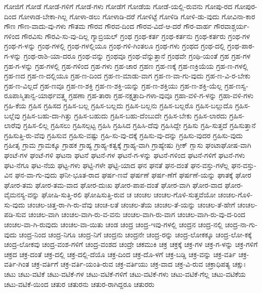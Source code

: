 {ಗೋಜಿಗೆ
ಗೋಡೆ
ಗೋಡೆ-ಗಳಿಗೆ
ಗೋಡೆ-ಗಳು
ಗೋಡೆಗೆ
ಗೋಡೆಯ
ಗೋಡೆ-ಯಲ್ಲಿ-ರುವನು
ಗೋಪು-ರದ
ಗೋಪುರ-ದಿಂದ
ಗೋಳಾಡ-ಬೇಕಾ-ಗಿಲ್ಲ
ಗೋಳಾ-ಡಲು
ಗೋಳಾಡಿ-ದರೆ
ಗೋಳಿಟ್ಟೆ
ಗೋಳಿಡಿ
ಗೋಳಿ-ಡು-ವುದು
ಗೋವಿನಾ-ಕಾರ
ಗೌಣ
ಗೌಣ-ವಾದು-ವು-ಗಳು
ಗೌತಮ
ಗೌರವ
ಗೌರವ-ದಿಂದ
ಗೌರವ-ವಿದೆ-ಆ-ದರೆ
ಗೌರ-ವಾರ್ಹ
ಗೌರವಾಶ್ಚರ್ಯ-ಗಳಿಂದ
ಗೌರವಿಸು
ಗೌರವಿ-ಸು-ವು-ದಿಲ್ಲ
ಗ್ಯಾಬ್ರಿಯಲ್
ಗ್ರಂಥ
ಗ್ರಂಥ-ಕರ್ತ
ಗ್ರಂಥ-ಕರ್ತನು
ಗ್ರಂಥ-ಕರ್ತರು
ಗ್ರಂಥ-ಗಳ
ಗ್ರಂಥ-ಗ-ಳನ್ನು
ಗ್ರಂಥ-ಗಳಲ್ಲಿ
ಗ್ರಂಥ-ಗಳಲ್ಲಿಯೂ
ಗ್ರಂಥ-ಗಳಿ-ಗಿಂತಲೂ
ಗ್ರಂಥ-ಗಳು
ಗ್ರಂಥದ
ಗ್ರಂಥ-ದಲ್ಲಿ
ಗ್ರಂಥ-ಪಾಠ-ಗ-ಳನ್ನು
ಗ್ರಂಥ-ರಾಶಿ-ಯಾ-ದರೂ
ಗ್ರಂಥ-ವನ್ನು
ಗ್ರಂಥವೂ
ಗ್ರಂಥ-ವೆನ್ನುತ್ತಾನೆ
ಗ್ರಂಥವೇ
ಗ್ರಂಥಿ-ಯಂತೆ
ಗ್ರಹ
ಗ್ರಹ-ಗಳ
ಗ್ರಹ-ಗ-ಳನ್ನು
ಗ್ರಹ-ಗಳಲ್ಲಿ
ಗ್ರಹ-ಗಳಿಂದ
ಗ್ರಹ-ಗಳು
ಗ್ರಹ-ಚಾರ
ಗ್ರಹಣ
ಗ್ರಹ-ಣಕ್ಕೆ
ಗ್ರಹ-ಣಕ್ರಿಯೆಯ
ಗ್ರಹ-ಣ-ಗಳಲ್ಲಿ
ಗ್ರಹ-ಣದ
ಗ್ರಹ-ಣ-ದಲ್ಲಿಯೂ
ಗ್ರಹ-ಣ-ದಿಂದ
ಗ್ರಹ-ಣ-ಮಾಡು-ವಾಗ
ಗ್ರಹ-ಣ-ವಾ-ಗು-ವುದು
ಗ್ರಹ-ಣ-ವಿ-ರ-ಬೇಕು
ಗ್ರಹ-ಣ-ವಿಲ್ಲದೆ
ಗ್ರಹ-ಣವೂ
ಗ್ರಹ-ಣ-ಶಕ್ತಿ
ಗ್ರಹ-ಣ-ಶಕ್ತಿ-ಯನ್ನು
ಗ್ರಹ-ಣ-ಶಕ್ತಿಯು
ಗ್ರಹ-ಣ-ಶಕ್ತಿ-ಯೆಲ್ಲ
ಗ್ರಹ-ಣಸ್ವ-ರೂಪಾಸ್ಮಿತಾನ್ವ-ಯಾರ್ಥವತ್ತ್ವ
ಗ್ರಹಣಾ
ಗ್ರಹ-ತಾರಾ
ಗ್ರಹ-ನಕ್ಷತ್ರಾದಿ-ಗಳಾ-ವುವೂ
ಗ್ರಹಾ-ವಳಿ-ಗ-ಳನ್ನು
ಗ್ರಹಾ-ವಳಿ-ಗಳು
ಗ್ರಹಿ-ಕೆಯ
ಗ್ರಹಿಸ
ಗ್ರಹಿಸದ
ಗ್ರಹಿಸ-ಬಲ್ಲ
ಗ್ರಹಿಸ-ಬಲ್ಲದು
ಗ್ರಹಿಸ-ಬಲ್ಲನು
ಗ್ರಹಿಸ-ಬಲ್ಲರೊ
ಗ್ರಹಿಸ-ಬಲ್ಲುದೊ
ಗ್ರಹಿಸ-ಬಲ್ಲೆವು
ಗ್ರಹಿಸ-ಬಹು-ದಾ-ಗಿತ್ತು
ಗ್ರಹಿಸ-ಬಹುದು
ಗ್ರಹಿಸ-ಬಹು-ದೆಂಬುದೇ
ಗ್ರಹಿಸ-ಬೇಕು
ಗ್ರಹಿಸ-ಲಾರದು
ಗ್ರಹಿಸ-ಲಾರೆವು
ಗ್ರಹಿಸ-ಲಿಲ್ಲ
ಗ್ರಹಿಸಲು
ಗ್ರಹಿಸಲ್ಪಟ್ಟ
ಗ್ರಹಿಸಿ
ಗ್ರಹಿಸಿದ
ಗ್ರಹಿಸಿ-ದೆವು
ಗ್ರಹಿಸಿದ್ದೇ
ಗ್ರಹಿಸು
ಗ್ರಹಿ-ಸುತ್ತದೆ
ಗ್ರಹಿಸುತ್ತಾನೆ
ಗ್ರಹಿಸುತ್ತಿ-ರು-ವೆವು
ಗ್ರಹಿಸುವ
ಗ್ರಹಿಸು-ವಷ್ಟು
ಗ್ರಹಿ-ಸು-ವು-ದಕ್ಕೆ
ಗ್ರಹಿಸು-ವು-ದನ್ನು
ಗ್ರಹಿಸು-ವುದರ
ಗ್ರಹಿಸು-ವುದು
ಗ್ರಹೀತೃ
ಗ್ರಾಮ
ಗ್ರಾಮಕ್ಕೂ
ಗ್ರಾಹಕ
ಗ್ರಾಹ್ಯ
ಗ್ರಾಹ್ಯ-ಕತ್ವಕ್ಕೆ
ಗ್ರಾಹ್ಯ-ವಾಗಿ
ಗ್ರಾಹ್ಯೇಷು
ಗ್ರೀಕ್
ಗ್ಲಾಸು
ಘಂಟಾಘೋಷ-ವಾಗಿ
ಘಂಟೆ-ಗಳ
ಘಂಟೆ-ಗಳಿ
ಘಟನಾ
ಘಟನೆ
ಘಟನೆ-ಗಳ
ಘಟನೆ-ಗ-ಳನ್ನು
ಘಟನೆ-ಗಳಿಂದ
ಘಟನೆ-ಗಳಿಗೆ
ಘಟನೆ-ಗಳು
ಘಟ-ನೆಗೂ
ಘಟ-ನೆಯ
ಘಟ್ಟ-ಗಳು
ಘಟ್ಟಿ-ಗಳೇ
ಘಟ್ಟಿ-ಯಾದ
ಘನ
ಘನತೆ
ಘನ-ದಂತೆ
ಘನ-ವಸ್ತು-ಗಳೆಲ್ಲ
ಘನ-ವಸ್ತು-ವಿನ
ಘನ-ವಾ-ಗು-ವುದು
ಘನೀ-ಭೂತ-ರಾದ
ಘರ್ಷ-ಣವೆ
ಘರ್ಷಣೆ
ಘರ್ಷ-ಣೆಗೆ
ಘರ್ಷಣೆ-ಯನ್ನು
ಘಾತಕ್ಕೆ
ಘೋರ
ಘೋರ-ತಮ
ಘೋರ-ತಮ-ವಾದ
ಘೋರ-ದುಃಖ
ಘೋರ-ಪಾಪ-ದಂತೆ
ಘೋರ-ವಾಗಿ
ಘೋರ-ವಾದ
ಘೋರ-ವೈಮನಸ್ಯ-ವನ್ನು
ಘೋಷಿ-ಸುತ್ತಿ-ರಲಿ
ಘೋಷಿಸುತ್ತಿ-ರುವ
ಚ
ಚಂಚಲ
ಚಂಚಲ-ಗೊಳಿ-ಸುತ್ತವೆಯೋ
ಚಂಚಲ-ಗೊಳಿ-ಸು-ವುದು
ಚಂಚಲ-ಚಿತ್ತ-ರಾ-ಗಿ-ರು-ವೆವು
ಚಂಚ-ಲತೆ
ಚಂಚಲ-ತೆಯ
ಚಂಚಲ-ತೆ-ಯನ್ನು
ಚಂಚಲ-ತೆ-ಹೇಗೆ
ಚಂಚಲ-ಪಡಿ-ಸುವ
ಚಂಚಲ-ವಾಗಿ
ಚಂಚಲ-ವಾಗಿ-ರು-ವ-ವನು
ಚಂಚಲ-ವಾಗಿ-ರು-ವಾಗ
ಚಂಚಲ-ವಾಗಿ-ರು-ವು-ದ-ರಿಂದ
ಚಂಚಲ-ವಾ-ಗಿ-ರುವುದು
ಚಂಚಲ-ವಾ-ಯಿತು
ಚಂಡ
ಚಂದ್ರ
ಚಂದ್ರ-ಇವು-ಗಳಲ್ಲಿ
ಚಂದ್ರನ
ಚಂದ್ರ-ನಲ್ಲಿ
ಚಂದ್ರ-ನಾ-ಗು-ವುದು
ಚಂದ್ರ-ನಿಂದ
ಚಂದ್ರ-ನಿಗೂ
ಚಂದ್ರ-ನಿಗೆ
ಚಂದ್ರನು
ಚಂದ್ರನೇ
ಚಂದ್ರ-ರನ್ನು
ಚಂದ್ರ-ಲೋಕಕ್ಕೂ
ಚಂದ್ರ-ಲೋ-ಕಕ್ಕೆ
ಚಂದ್ರ-ಲೋಕವು
ಚಂದ್ರ-ವಂಶ-ಗಳಿಗೆ
ಚಂದ್ರ-ವಂಶದ
ಚಂದ್ರೇ
ಚಕಮುಕಿ
ಚಕ್ರ
ಚಕ್ರಕ್ಕೆ
ಚಕ್ರ-ಗಳ
ಚಕ್ರ-ಗ-ಳನ್ನು
ಚಕ್ರ-ಗಳಿಗೆ
ಚಕ್ರದ
ಚಕ್ರ-ದಂತೆ
ಚಕ್ರ-ದಲ್ಲಿ
ಚಕ್ರ-ದಲ್ಲಿ-ದೆಯೊ
ಚಕ್ರ-ದಿಂದ
ಚಕ್ರ-ದೊ-ಳಗೆ
ಚಕ್ರ-ಬಡ್ಡಿ
ಚಕ್ರ-ವನ್ನು
ಚಕ್ರ-ವರ್ತಿ
ಚಕ್ರ-ವರ್ತಿ-ಗಿಂತ
ಚಕ್ರ-ವರ್ತಿಗೆ
ಚಕ್ರ-ವರ್ತಿ-ಯಂತಿ-ರುವ
ಚಕ್ರ-ವರ್ತಿಯು
ಚಕ್ರ-ವಾದ
ಚಕ್ರ-ವಿ-ರುವ
ಚಕ್ರಾಧಿಪತ್ಯ
ಚಕ್ಷುಃ
ಚಟು
ಚಟು-ವಟಿಕೆ
ಚಟು-ವಟಿಕೆ-ಗಳ
ಚಟು-ವಟಿಕೆ-ಗಳಿಗೆ
ಚಟು-ವಟಿಕೆ-ಗಳು
ಚಟು-ವಟಿಕೆ-ಗೆಲ್ಲ
ಚಟು-ವಟಿಕೆಯ
ಚಟು-ವಟಿಕೆ-ಯಿಂದ
ಚತುರ
ಚತುರನು
ಚತುರ-ರಾಗಿದ್ದರೂ
ಚತುರರು
}
